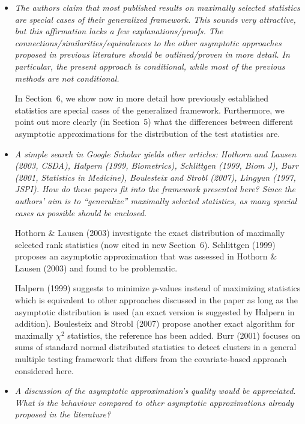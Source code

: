 \documentclass[11pt,a4paper]{article}
\begin{document}
\begin{itemize}

  \item \textit{The authors claim that most published results on maximally selected
        statistics are special cases of their generalized framework. This sounds very
	attractive, but this affirmation lacks a few explanations/proofs. The
        connections/similarities/equivalences to the other asymptotic approaches
        proposed in previous literature should be outlined/proven in more detail. In
        particular, the present approach is conditional, while most of the previous
        methods are not conditional.}
	
	In Section~6, we show now in more detail how previously established statistics
	are special cases of the generalized framework. Furthermore, we point out 
	more clearly (in Section~5) what the differences between different asymptotic approximations
	for the distribution of the test statistics are.
	
  \item \textit{A simple search in Google Scholar yields other articles: Hothorn and
        Lausen (2003, CSDA), Halpern (1999, Biometrics), Schlittgen (1999, Biom J),
	Burr (2001, Statistics in Medicine), Boulesteix and Strobl (2007),
	Lingyun (1997, JSPI). How do these papers fit into the framework presented here?
	Since the authors' aim is to ``generalize'' maximally selected statistics, as
	many special cases as possible should be enclosed.}
	
        Hothorn \& Lausen (2003) investigate the exact distribution of maximally
        selected rank statistics (now cited in new Section~6). Schlittgen (1999)
        proposes an asymptotic approximation that was assessed in Hothorn \& Lausen (2003)
	and found to be problematic. 

        Halpern (1999) suggests to minimize $p$-values instead of maximizing 
        statistics which is equivalent to other approaches discussed in the paper 
        as long as the asymptotic distribution is used (an exact version is suggested 
        by Halpern in addition).
        Boulesteix and Strobl (2007) propose another exact algorithm for maximally
        $\chi^2$ statistics, the reference has been added.
        Burr (2001) focuses on sums of standard normal distributed statistics
        to detect clusters in a general multiple testing framework that differs
	from the covariate-based approach considered here.
	
  \item \textit{A discussion of the asymptotic approximation's quality would be appreciated.
        What is the behaviour compared to other asymptotic approximations already
        proposed in the literature?}
	

\end{itemize}
\end{document}

